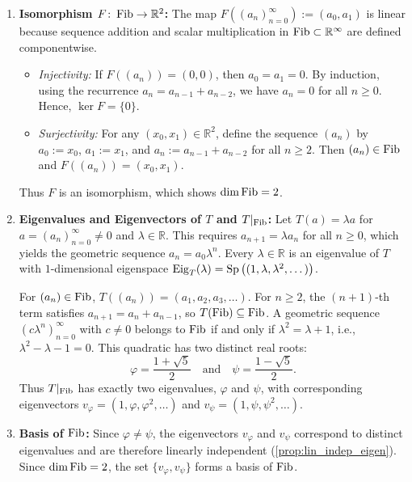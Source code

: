 \begin{exercisesolution}
\label{sol:fibonacci_sequence_space_shift_eigenvalues}
\begin{enumerate}[label=\textbf{(\alph*)}]
    \item \textbf{Isomorphism $F \colon \operatorname{Fib} \to \mathbb{R}^2$:}
    The map $F((a_n)_{n=0}^\infty) := (a_0, a_1)$ is linear because sequence addition and scalar multiplication in $\operatorname{Fib} \subset \mathbb{R}^\infty$ are defined componentwise.
    \begin{itemize}
        \item \emph{Injectivity:} If $F((a_n)) = (0, 0)$, then $a_0 = a_1 = 0$. By induction, using the recurrence $a_n = a_{n-1} + a_{n-2}$, we have $a_n = 0$ for all $n \ge 0$. Hence, $\ker F = \{0\}$.
        \item \emph{Surjectivity:} For any $(x_0, x_1) \in \mathbb{R}^2$, define the sequence $(a_n)$ by $a_0 := x_0$, $a_1 := x_1$, and $a_n := a_{n-1} + a_{n-2}$ for all $n \ge 2$. Then $(a_n) \in \operatorname{Fib}$ and $F((a_n)) = (x_0, x_1)$.
    \end{itemize}
    Thus $F$ is an isomorphism, which shows $\dim \operatorname{Fib} = 2$.

    \item \textbf{Eigenvalues and Eigenvectors of $T$ and $T|_{\operatorname{Fib}}$:}
    Let $T(a) = \lambda a$ for $a = (a_n)_{n=0}^\infty \ne 0$ and $\lambda \in \mathbb{R}$. This requires $a_{n+1} = \lambda a_n$ for all $n \ge 0$, which yields the geometric sequence $a_n = a_0 \lambda^n$.
    Every $\lambda \in \mathbb{R}$ is an eigenvalue of $T$ with $1$-dimensional eigenspace $\operatorname{Eig}_T(\lambda) = \operatorname{Sp}\big((1, \lambda, \lambda^2, \dots)\big)$.

    For $(a_n) \in \operatorname{Fib}$, $T((a_n)) = (a_1, a_2, a_3, \dots)$. For $n \ge 2$, the $(n+1)$-th term satisfies $a_{n+1} = a_n + a_{n-1}$, so $T(\operatorname{Fib}) \subseteq \operatorname{Fib}$.
    A geometric sequence $(c \lambda^n)_{n=0}^\infty$ with $c \ne 0$ belongs to $\operatorname{Fib}$ if and only if $\lambda^2 = \lambda + 1$, i.e., $\lambda^2 - \lambda - 1 = 0$.
    This quadratic has two distinct real roots:
    \[
    \varphi = \frac{1+\sqrt{5}}{2} \quad \text{and} \quad \psi = \frac{1-\sqrt{5}}{2}.
    \]
    Thus $T|_{\operatorname{Fib}}$ has exactly two eigenvalues, $\varphi$ and $\psi$, with corresponding eigenvectors $v_\varphi = (1, \varphi, \varphi^2, \dots)$ and $v_\psi = (1, \psi, \psi^2, \dots)$.

    \item \textbf{Basis of $\operatorname{Fib}$:}
    Since $\varphi \ne \psi$, the eigenvectors $v_\varphi$ and $v_\psi$ correspond to distinct eigenvalues and are therefore linearly independent (\cref{prop:lin_indep_eigen}).
    Since $\dim \operatorname{Fib} = 2$, the set $\{v_\varphi, v_\psi\}$ forms a basis of $\operatorname{Fib}$. \qedhere
\end{enumerate}
\end{exercisesolution}

